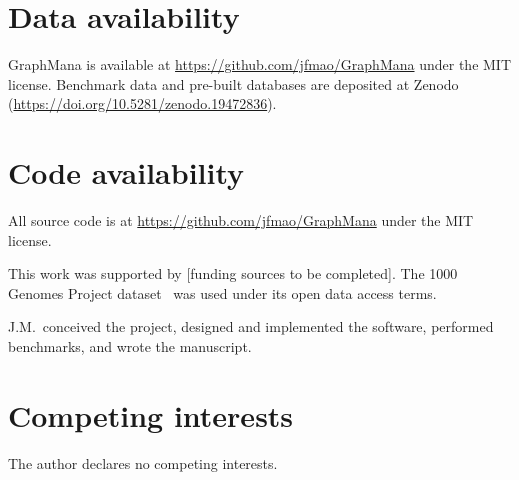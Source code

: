 \documentclass[pdflatex,sn-nature]{sn-jnl}
\begin{document}
\section*{Data availability}

GraphMana is available at \url{https://github.com/jfmao/GraphMana} under the MIT license. Benchmark data and pre-built databases are deposited at Zenodo (\url{https://doi.org/10.5281/zenodo.19472836}).

\section*{Code availability}

All source code is at \url{https://github.com/jfmao/GraphMana} under the MIT license.


This work was supported by [funding sources to be completed]. The 1000 Genomes Project dataset~\cite{byrska2022} was used under its open data access terms.


J.M.\ conceived the project, designed and implemented the software, performed benchmarks, and wrote the manuscript.

\section*{Competing interests}

The author declares no competing interests.

\end{document}
